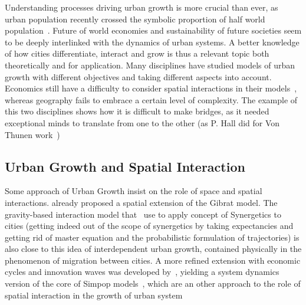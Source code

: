 \documentclass[Royal,sageh,times]{sagej}
\begin{document}
Understanding processes driving urban growth is more crucial than ever, as urban population recently crossed the symbolic proportion of half world population~\cite{}.%
 Future of world economies and sustainability of future societies seem to be deeply interlinked with the dynamics of urban systems.%
 A better knowledge of how cities differentiate, interact and grow is thus a relevant topic both theoretically and for application. Many disciplines have studied models of urban growth with different objectives and taking different aspects into account. Economics still have a difficulty to consider spatial interactions in their models~\cite{krugman1998space}, whereas geography fails to embrace a certain level of complexity. The example of this two disciplines shows how it is difficult to make bridges, as it needed exceptional minds to translate from one to the other (as P. Hall did for Von Thunen work~\cite{taylor2016polymath}) %





\subsection{Urban Growth and Spatial Interaction}


Some approach of Urban Growth insist on the role of space and spatial interactions. \cite{bretagnolle2000long} already proposed a spatial extension of the Gibrat model. The gravity-based interaction model that~\cite{sanders1992systeme} use to apply concept of Synergetics to cities (getting indeed out of the scope of synergetics by taking expectancies and getting rid of master equation and the probabilistic formulation of trajectories) is also close to this idea of interdependent urban growth, contained physically in the phenomenon of migration between cities. A more refined extension with economic cycles and innovation waves was developed by~\cite{favaro2011gibrat}, yielding a system dynamics version of the core of Simpop models~\cite{pumain2012multi}, which are an other approach to the role of spatial interaction in the growth of urban system
\end{document}
